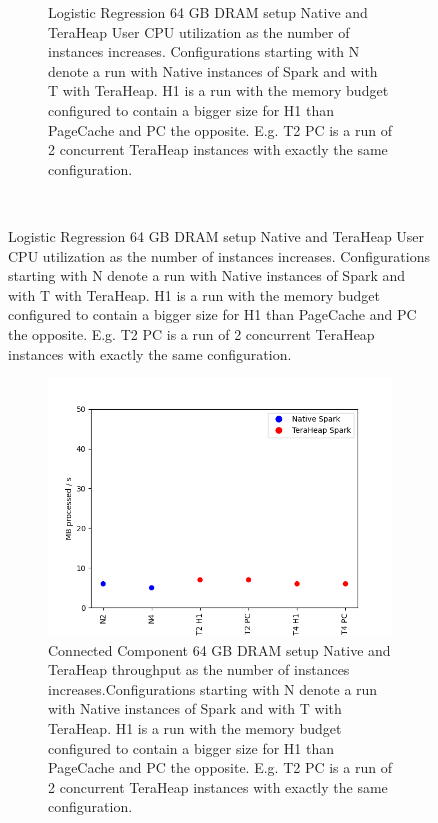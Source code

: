 \begin{figure}[htbp]
\begin{subfigure}[b]{0.48\textwidth}
    \caption{Logistic Regression 64 GB DRAM setup Native and TeraHeap
    User CPU utilization as the number of instances increases. Configurations
    starting with N denote a run with Native instances of Spark and
    with T with TeraHeap. H1 is a run with the memory budget
    configured to contain a bigger size for H1 than PageCache and PC
    the opposite. E.g. T2 PC is a run of 2 concurrent TeraHeap
    instances with exactly the same configuration.}
	   \label{fig:logr_64_usr}
    \end{subfigure}\\[1em]
\end{figure}

\begin{figure}[htbp]
	\centering
        \begin{subfigure}[b]{0.48\textwidth}
        \includegraphics[width=\linewidth]{./fig/CC_64_THR.png}
    \caption{Connected Component 64 GB DRAM setup Native and TeraHeap
    throughput as the number of instances increases.Configurations
    starting with N denote a run with Native instances of Spark and
    with T with TeraHeap. H1 is a run with the memory budget
    configured to contain a bigger size for H1 than PageCache and PC
    the opposite. E.g. T2 PC is a run of 2 concurrent TeraHeap
    instances with exactly the same configuration. }
		\label{fig:cc_64_thr}
	\end{subfigure}
\begin{subfigure}[b]{0.48\textwidth}

\end{subfigure}
\end{figure}
